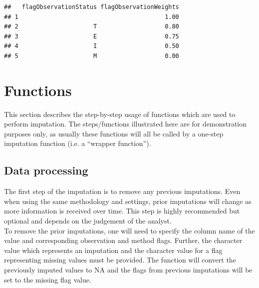 \documentclass[nojss]{jss}
\begin{document}
\begin{knitrout}
\color{fgcolor}\begin{kframe}
\begin{alltt}
 \hlkwb{=} 
\hlopt{$} \hlkwb{=}
    \hlopt{$}
\end{alltt}
\begin{verbatim}
##   flagObservationStatus flagObservationWeights
## 1                                         1.00
## 2                     T                   0.80
## 3                     E                   0.75
## 4                     I                   0.50
## 5                     M                   0.00
\end{verbatim}
\end{kframe}
\end{knitrout}


\section{Functions}
This section describes the step-by-step usage of functions which are
used to perform imputation.  The steps/functions illustrated here are for
demonstration purposes only, as usually these functions will all be called by a
one-step imputation function  (i.e. a ``wrapper
function'').

\subsection{Data processing}

The first step of the imputation is to remove any previous imputations.
Even when using the same methodology and settings, prior
imputations will change as more information is received over time. This
step is highly recommended but optional and depends on the judgement
of the analyst. \\

To remove the prior imputations, one will need to specify the column
name of the value and corresponding observation and method flags.  Further,
the character value which represents an imputation and the character value
for a flag representing missing values must be provided. The function will
convert the previously imputed values to NA
and the flags from previous imputations will be set to the missing flag value.
\end{document}
